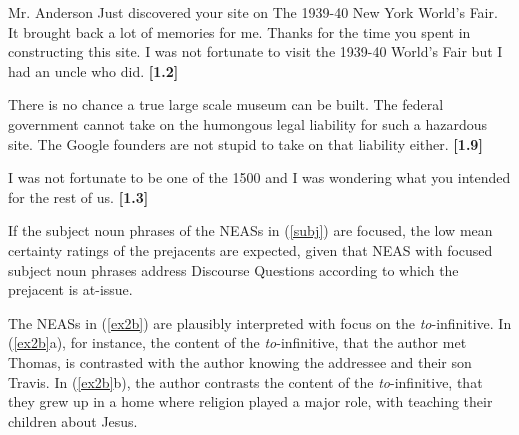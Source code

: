 \documentclass[11pt,fleqn]{article}
\newcommand{\6}{\mbox{$[\hspace*{-.6mm}[$}}
\newcommand{\9}{\mbox{$]\hspace*{-.6mm}]$}}
\begin{document}
\begin{exe} 

\ex\label{subj}

\begin{xlist}

\ex Mr. Anderson Just discovered your site on
The 1939-40 New York World's Fair. It brought back a lot of memories for
me. Thanks for the time you spent in constructing this site. I was not
fortunate to visit the 1939-40 World's Fair but I had an uncle who did. \hfill {\bf [1.2]}


\ex There is no chance a true large scale museum can be built. The federal government cannot take on the humongous legal liability for such a hazardous site. The Google founders are not stupid to take on that liability either. \hfill {\bf [1.9]}

\ex I was not fortunate to be one of the 1500 and I was wondering what you intended for the rest of us. \hfill {\bf [1.3]}


\end{xlist}

\end{exe}
If the subject noun phrases of the NEASs in (\ref{subj}) are focused, the low mean certainty ratings of the prejacents are expected, given that NEAS with focused subject noun phrases address Discourse Questions according to which the prejacent is at-issue.

The NEASs in (\ref{ex2b}) are plausibly interpreted with focus on the {\em to}-infinitive. In (\ref{ex2b}a), for instance, the content of the {\em to}-infinitive, that the author met Thomas, is contrasted with the author knowing the addressee and their son Travis. In (\ref{ex2b}b), the author contrasts the content of the {\em to}-infinitive, that they grew up in a home where religion played a major role, with teaching their children about Jesus. 
\end{document}
